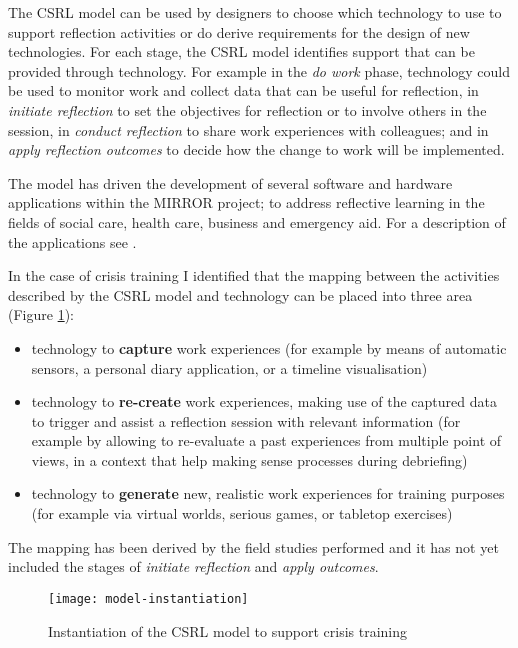 The CSRL model can be used by designers to choose which technology to use to support reflection activities or do derive requirements for the design of new technologies. For each stage, the CSRL model identifies support that can be provided through technology. For example in the \emph{do work} phase, technology could be used to monitor work and collect data that can be useful for reflection, in \emph{initiate reflection} to set the objectives for reflection or to involve others in the session, in \emph{conduct reflection} to share work experiences with colleagues; and in \emph{apply reflection outcomes} to decide how the change to work will be implemented.

The model has driven the development of several software and hardware applications within the MIRROR project; to address reflective learning in the fields of social care, health care, business and emergency aid. For a description of the applications see \autocite{Schwantzer:2014we}. 

In the case of crisis training I identified that the mapping between the activities described by the CSRL model and technology can be placed into three area (Figure \ref{fig:model-instantiation}):
\begin{itemize}
	\itemsep1pt\parskip0pt 
	\item technology to \textbf{capture} work experiences (for example by means of automatic sensors, a personal diary application, or a timeline visualisation) 
	\item technology to \textbf{re-create} work experiences, making use of the captured data to trigger and assist a reflection session with relevant information (for example by allowing to re-evaluate a past experiences from multiple point of views, in a context that help making sense processes during debriefing) 
	\item technology to \textbf{generate} new, realistic work experiences for training purposes (for example via virtual worlds, serious games, or tabletop exercises) 
\end{itemize}

The mapping has been derived by the field studies performed and it has not yet included the stages of \emph{initiate reflection} and \emph{apply outcomes}.

\begin{figure}
	[htb] \centering 
	\texttt{[image: model-instantiation]} \caption{Instantiation of the CSRL model to support crisis training} \label{fig:model-instantiation} 
\end{figure}


